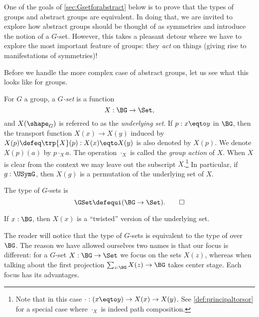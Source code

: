 One of the goals of \cref{sec:Gsetforabstract} below
is to prove that the types of groups and abstract groups are equivalent.
In doing that, we are invited to explore how abstract groups should be thought of as symmetries and introduce the notion of a $G$-set.
However, this takes a pleasant detour where we have to explore the most important feature of groups: they \emph{act} on things (giving rise to manifestations of symmetries)!

Before we handle the more complex case of abstract groups,
let us see what this looks like for groups.

\begin{definition}
  For $G$ a group, a \emph{$G$-set} is a function
  \[
    X : \BG\to\Set,
  \]
  and $X(\shape_G)$ is referred to as the \emph{underlying set}.
  If $p:x\eqto y$ in $\BG$,
  then the transport function $X(x)\to X(y)$ induced
  by $X(p)\defeq\trp{X}(p) : X(x)\eqto X(y)$ is also denoted by $X(p)$.
  We denote $X(p)(a)$ by $p\cdot_X a$.
  The operation $\cdot_X$ is called the \emph{group action} of $X$.
  When $X$ is clear from the context we may leave out the
  subscript $X$.\footnote{%
    Note that in this case $\cdot: (x\eqto y) \to X(x) \to X(y)$.
    See \cref{def:principaltorsor} for a special case
    where $\cdot_X$ is indeed path composition.}
  In particular, if $g:\USymG$,
  then $X(g)$ is a permutation of the underlying set of $X$.

  The type of $G$-sets is
  \[
    \GSet\defequi(\BG\to\Set).\qedhere
  \]
\end{definition}
If $x:\BG$, then $X(x)$ is a ``twisted'' version of the underlying set.
\begin{remark}
  The reader will notice that the type of $G$-sets is equivalent to the
type of \coverings over $\BG$.
The reason we have allowed ourselves two names is that our focus is different: for a $G$-set $X:\BG\to\Set$ we focus on the sets $X(z)$, whereas when talking about \coverings the first projection $\sum_{z:\BG}X(z)\to \BG$ takes center stage.  Each focus has its advantages.
\end{remark}

